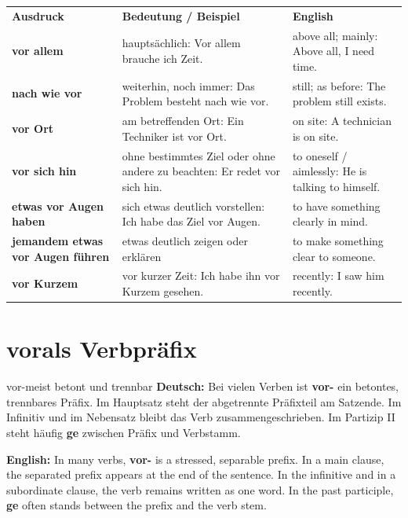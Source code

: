 \documentclass[a4paper,11pt]{article}
\newcommand{\GermanText}[1]{\textbf{Deutsch: }#1\par}
\newcommand{\EnglishText}[1]{{\small\color{SoftGray}\textbf{English: }#1\par}}
\begin{document}
        \begin{longtable}{>{\bfseries}p{3.8cm}p{5.3cm}p{5.7cm}}
            \rowcolor{HeaderBlueDark}
            \color{white}\textbf{Ausdruck} &
            \color{white}\textbf{Bedeutung / Beispiel} &
            \color{white}\textbf{English} \\
            vor allem & hauptsächlich: Vor allem brauche ich Zeit. & above all; mainly: Above all, I need time. \\
            nach wie vor & weiterhin, noch immer: Das Problem besteht nach wie vor. & still; as before: The problem still exists. \\
            vor Ort & am betreffenden Ort: Ein Techniker ist vor Ort. & on site: A technician is on site. \\
            vor sich hin & ohne bestimmtes Ziel oder ohne andere zu beachten: Er redet vor sich hin. & to oneself / aimlessly: He is talking to himself. \\
            etwas vor Augen haben & sich etwas deutlich vorstellen: Ich habe das Ziel vor Augen. & to have something clearly in mind. \\
            jemandem etwas vor Augen führen & etwas deutlich zeigen oder erklären & to make something clear to someone. \\
            vor Kurzem & vor kurzer Zeit: Ich habe ihn vor Kurzem gesehen. & recently: I saw him recently. \\
        \end{longtable}


    \section{\glqq vor\grqq als Verbpräfix}

        \begin{grammarentry}{vor-}{meist betont und trennbar}
            \GermanText{Bei vielen Verben ist \textbf{vor-} ein betontes, trennbares Präfix. Im Hauptsatz steht der abgetrennte Präfixteil am Satzende. Im Infinitiv und im Nebensatz bleibt das Verb zusammengeschrieben. Im Partizip II steht häufig \textbf{ge} zwischen Präfix und Verbstamm.}
            \EnglishText{In many verbs, \textbf{vor-} is a stressed, separable prefix. In a main clause, the separated prefix appears at the end of the sentence. In the infinitive and in a subordinate clause, the verb remains written as one word. In the past participle, \textbf{ge} often stands between the prefix and the verb stem.}
        \end{grammarentry}
\end{document}
